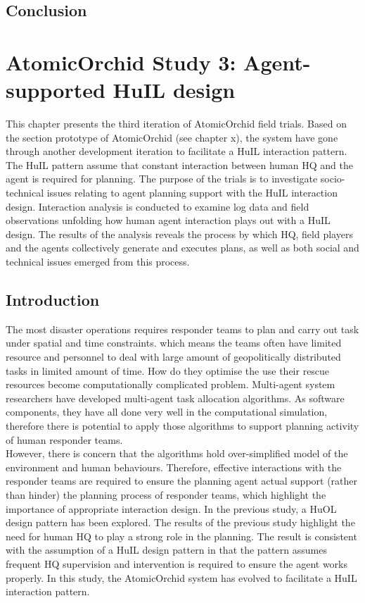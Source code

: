\section{Conclusion}

\chapter{AtomicOrchid Study 3: Agent-supported HuIL design}\label{ch:mathtest} 
This chapter presents the third iteration of AtomicOrchid field trials. Based on the section prototype of AtomicOrchid (see chapter x), the system have gone through another development iteration to facilitate a HuIL interaction pattern. The HuIL pattern assume that constant interaction between human HQ and the  agent is required for planning. The purpose of the trials is to investigate socio-technical issues relating to agent planning support with the HuIL interaction design. Interaction analysis is conducted to examine log data and field observations unfolding how human agent interaction plays out with a HuIL design. The results of the analysis reveals the process by which HQ, field players and the agents collectively generate and executes plans, as well as  both social and technical issues emerged from this process.  \\


\section{Introduction}
The most disaster operations requires responder teams to plan and carry out task under spatial and time constraints. which means the teams often have limited resource and personnel to deal with large amount of geopolitically distributed tasks in limited amount of time. How do they optimise the use their rescue resources become computationally complicated problem. Multi-agent system researchers have developed multi-agent task allocation algorithms. As software components, they have all done very well in the computational simulation, therefore there is potential to apply those algorithms to support planning activity of human responder teams. \\

However, there is concern that the algorithms hold over-simplified model of the environment and human behaviours. Therefore, effective interactions with the responder teams are required to ensure the planning agent actual support (rather than hinder) the planning process of responder teams, which highlight the importance of appropriate interaction design. In the previous study, a HuOL design pattern has been explored. The results of the previous study highlight the need for human HQ to play a strong role in the planning. The result is consistent with the assumption of a HuIL design pattern in that the pattern assumes frequent HQ supervision and intervention is required to ensure the agent works properly. In this study, the AtomicOrchid system has evolved to facilitate a HuIL interaction pattern.\\

